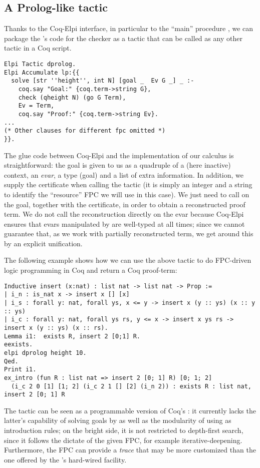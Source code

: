 \subsection{A Prolog-like tactic}

Thanks to the Coq-Elpi interface, in particular to the ``main''
procedure , we can package the \lP's code for the checker
as a tactic that can be called as any other tactic in a Coq script.

\begin{lstlisting}[deletekeywords={goal}]
Elpi Tactic dprolog.
Elpi Accumulate lp:{{
  solve [str ''height'', int N] [goal _  Ev G _] _ :-
    coq.say "Goal:" {coq.term->string G},
    check (qheight N) (go G Term),
    Ev = Term,
    coq.say "Proof:" {coq.term->string Ev}.
...
(* Other clauses for different fpc omitted *)
}}.
\end{lstlisting}

The glue code between Coq-Elpi and the implementation of our calculus
is straightforward: the goal is given to us as a quadruple of a (here
inactive) context, an \emph{evar}, a type (goal) and a list of extra
information. In addition, we supply the certificate  when calling the tactic (it is simply  an integer and a string to
identify the ``resource'' FPC we will use in this case). We just need
to call  on the goal, together with the
certificate, in order to obtain a reconstructed proof term. We do not
call the reconstruction directly on the evar because Coq-Elpi
ensures that evars manipulated by \lP are well-typed at all times; since
we cannot guarantee that, as we work with partially reconstructed
term, we  get  around this by an explicit unification.

The following
example shows how we can use the above tactic to do FPC-driven logic
programming in Coq and return a Coq proof-term:
\begin{lstlisting}
Inductive insert (x:nat) : list nat -> list nat -> Prop :=
| i_n : is_nat x -> insert x [] [x]
| i_s : forall y: nat, forall ys, x <= y -> insert x (y :: ys) (x :: y :: ys)
| i_c : forall y: nat, forall ys rs, y <= x -> insert x ys rs -> insert x (y :: ys) (x :: rs).
Lemma i1:  exists R, insert 2 [0;1] R.
eexists.
elpi dprolog height 10.
Qed.
Print i1.
ex_intro (fun R : list nat => insert 2 [0; 1] R) [0; 1; 2]
  (i_c 2 0 [1] [1; 2] (i_c 2 1 [] [2] (i_n 2)) : exists R : list nat, insert 2 [0; 1] R
\end{lstlisting}

The  tactic can be seen as a programmable version of
Coq's : it currently lacks the latter's capability of
solving goals by  as well as the modularity of using
 as introduction rules; on the bright side, it is not
restricted to depth-first search, since it follows the dictate of the
given FPC, for example iterative-deepening. Furthermore, the FPC can
provide a \emph{trace} that may be more customized than the one
offered by the 's hard-wired  facility.

